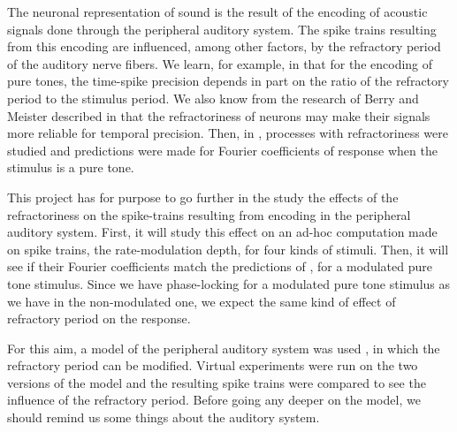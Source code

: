 The neuronal representation of sound is the result of the encoding of acoustic 
signals done through the peripheral auditory system. 
The spike trains resulting from this encoding are influenced, 
among other factors, by the refractory period of the 
auditory nerve fibers. 
We learn, for example, in \cite{AvissarPapier} that for the encoding of pure tones, 
the time-spike precision depends in part on the ratio of  
the refractory period to the stimulus period. 
We also know from the research of Berry and Meister described 
in \cite{BerryMeister} that the refractoriness of neurons may make their signals 
more reliable for temporal precision. 
Then, in \cite{Deger}, processes with refractoriness were studied 
and predictions 
were made for Fourier coefficients of response when the stimulus is a pure tone.%

This project has for purpose to go further in the study the effects of 
the refractoriness on the spike-trains resulting from encoding in the peripheral 
auditory system.  
First, it will study this effect on an ad-hoc computation made on spike trains,  
the rate-modulation depth, for four kinds of stimuli.
Then, it will see if their Fourier coefficients match the predictions
of \cite{Deger}, for a modulated pure tone stimulus. 
Since we have phase-locking for a modulated pure tone stimulus 
as we have in the non-modulated one, we expect the same kind of effect of refractory 
period on the response.





For this aim, a model of the peripheral auditory system was used
\cite{Model1, Model2, Model3}, in which the refractory period can be modified. 
Virtual experiments were run on the two versions of the model and the resulting 
spike trains were compared to see the influence of the refractory period. 
Before going any deeper on the model, we should remind us some things 
about the auditory system.


